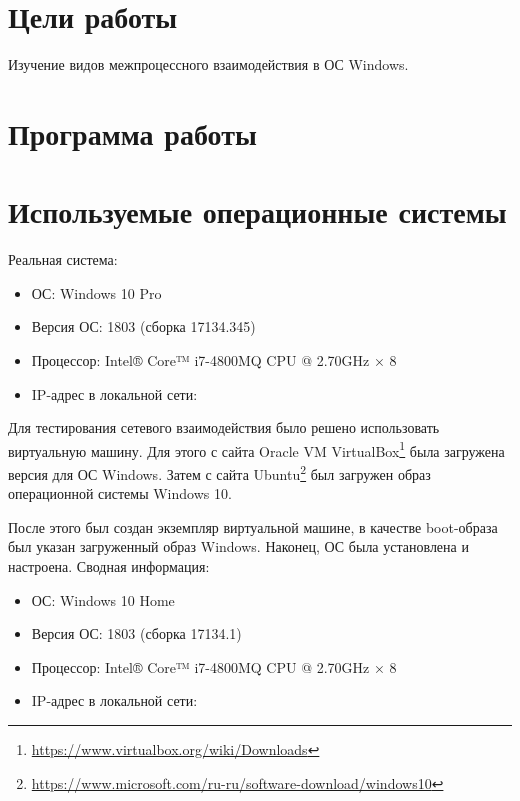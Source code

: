 





\tableofcontents
\newpage

\section{Цели работы}

Изучение видов межпроцессного взаимодействия в ОС Windows.

\section{Программа работы}



\section{Используемые операционные системы}

Реальная система:
\begin{itemize}
	\item ОС: Windows 10 Pro
	\item Версия ОС: 1803 (сборка 17134.345)
	\item Процессор: Intel® Core™ i7-4800MQ CPU @ 2.70GHz × 8
	\item IP-адрес в локальной сети: 
\end{itemize}



Для тестирования сетевого взаимодействия было решено использовать виртуальную машину. Для этого с сайта Oracle VM VirtualBox\footnote{\url{https://www.virtualbox.org/wiki/Downloads}} была загружена версия для ОС Windows. Затем с сайта Ubuntu\footnote{\url{https://www.microsoft.com/ru-ru/software-download/windows10}} был загружен  образ операционной системы Windows 10. 

После этого был создан экземпляр виртуальной машине, в качестве boot-образа был указан загруженный образ Windows. Наконец, ОС была установлена и настроена. Сводная информация:
\begin{itemize}
	\item ОС: Windows 10 Home
	\item Версия ОС: 1803 (сборка 17134.1)
	\item Процессор: Intel® Core™ i7-4800MQ CPU @ 2.70GHz × 8
	\item IP-адрес в локальной сети: 
\end{itemize}

